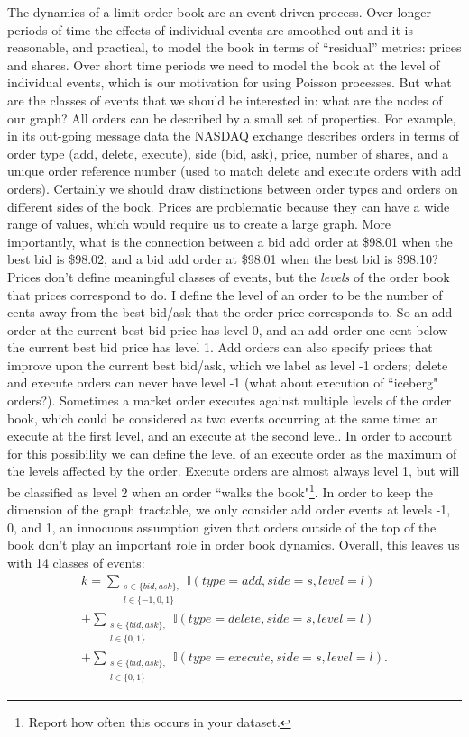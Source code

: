 The dynamics of a limit order book are an event-driven process. Over longer periods of time the effects of individual events are smoothed out and it is reasonable, and practical, to model the book in terms of ``residual'' metrics: prices and shares. Over short time periods we need to model the book at the level of individual events, which is our motivation for using Poisson processes. But what are the classes of events that we should be interested in: what are the nodes of our graph? All orders can be described by a small set of properties. For example, in its out-going message data the NASDAQ exchange describes orders in terms of order type (add, delete, execute), side (bid, ask), price, number of shares, and a unique order reference number (used to match delete and execute orders with add orders). Certainly we should draw distinctions between order types and orders on different sides of the book. Prices are problematic because they can have a wide range of values, which would require us to create a large graph. More importantly, what is the connection between a bid add order at \$98.01 when the best bid is \$98.02, and a bid add order at \$98.01 when the best bid is \$98.10? Prices don't define meaningful classes of events, but the \textit{levels} of the order book that prices correspond to do. I define the level of an order to be the number of cents away from the best bid/ask that the order price corresponds to. So an add order at the current best bid price has level 0, and an add order one cent below the current best bid price has level 1. Add orders can also specify prices that improve upon the current best bid/ask, which we label as level -1 orders; delete and execute orders can never have level -1 (what about execution of ``iceberg" orders?). Sometimes a market order executes against multiple levels of the order book, which could be considered as two events occurring at the same time: an execute at the first level, and an execute at the second level. In order to account for this possibility we can define the level of an execute order as the maximum of the levels affected by the order. Execute orders are almost always level 1, but will be classified as level 2 when an order ``walks the book"\footnote{Report how often this occurs in your dataset.}. In order to keep the dimension of the graph tractable, we only consider add order events at levels -1, 0, and 1, an innocuous assumption given that orders outside of the top of the book don't play an important role in order book dynamics. Overall, this leaves us with 14 classes of events:
\begin{multline}
k =  \sum_{\substack{s \in \{bid,ask\}, \\ l \in \{-1, 0, 1\}}} \mathbb{I}(type=add, side=s, level=l) \\
+ \sum_{\substack{s \in \{bid,ask\}, \\ l \in \{0, 1\}}} \mathbb{I}(type=delete, side=s, level=l) \\
+ \sum_{\substack{s \in \{bid,ask\}, \\ l \in \{0, 1\}}} \mathbb{I}(type=execute, side=s, level=l).
\end{multline}
